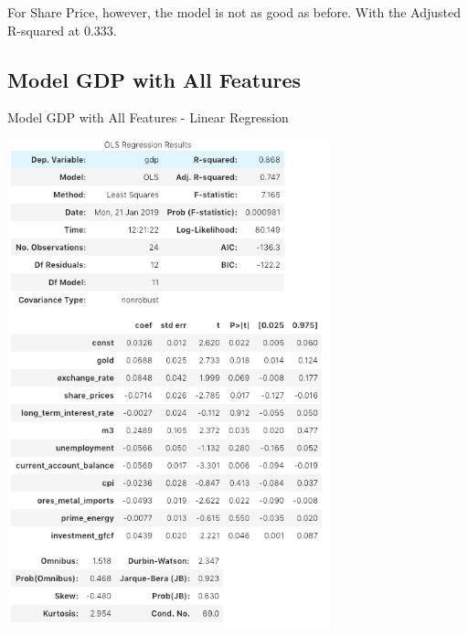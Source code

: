 \documentclass{elsarticle}
\begin{document}
For Share Price, however, the model is not as good as before. With the Adjusted R-squared at 0.333.

\newpage
\subsection{Model GDP with All Features}
\begin{table}[H]
  \centering
  \caption{Model GDP with All Features - Linear Regression}
  \includegraphics[width=0.7\textwidth]{images/ols_3.png}
\end{table}
\end{document}
